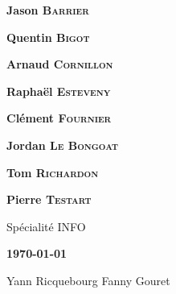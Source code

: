 \pagestyle{empty}
\selectfont


\def\mate#1{\textbf{\color{white}\large #1}}


\hspace{-0.75cm}
\begin{minipage}{21cm}

\noindent {}

\vspace{-27.6cm}
\hspace{12cm}\begin{minipage}{8cm}
\begin{flushright}

\mate{Jason \textsc{Barrier}}

\vspace{3mm}
\mate{Quentin \textsc{Bigot}}

\vspace{3mm}
\mate{Arnaud \textsc{Cornillon}}

\vspace{3mm}
\mate{Raphaël \textsc{Esteveny}}

\vspace{3mm}
\mate{Clément \textsc{Fournier}}

\vspace{3mm}
\mate{Jordan \textsc{Le Bongoat}}

\vspace{3mm}
\mate{Tom \textsc{Richardon}}

\vspace{3mm}
\mate{Pierre \textsc{Testart}}

\vspace{5mm}
{\color{white}Spécialité INFO}

\vspace{1mm}
\end{flushright}
\end{minipage}
\end{minipage}

\vspace{12.7cm}
\hspace{7cm}\begin{minipage}{11cm}
\noindent \Huge\bfseries \thetitle
	\baselineskip=20pt
    
 
{\Large \bfseries\color{gray} \today}

Yann Ricquebourg
Fanny Gouret
	
\end{minipage}


%

\newpage
\restoregeometry

